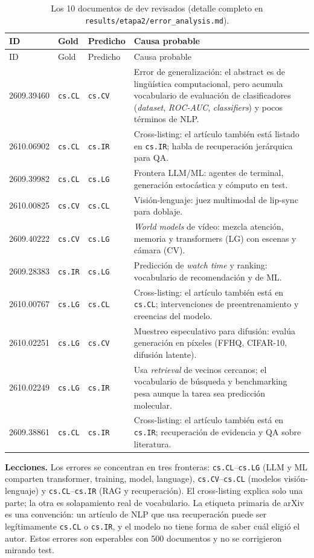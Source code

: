 \documentclass[11pt,a4paper]{article}
\newcommand{\code}[1]{\texttt{#1}}
\begin{document}
\begin{longtable}{@{}p{1.9cm}p{2.3cm}p{2.3cm}>{\raggedright\arraybackslash}p{7.2cm}@{}}
\caption{Los 10 documentos de dev revisados (detalle completo en
\code{results/etapa2/error\_analysis.md}).}\\
\toprule
ID & Gold & Predicho & Causa probable\\
\midrule
\endfirsthead
\toprule
ID & Gold & Predicho & Causa probable\\
\midrule
\endhead
2609.39460 & \code{cs.CL} & \code{cs.CV} & Error de generalización: el abstract es de lingüística computacional, pero acumula vocabulario de evaluación de clasificadores (\emph{dataset}, \emph{ROC-AUC}, \emph{classifiers}) y pocos términos de NLP.\\
2610.06902 & \code{cs.CL} & \code{cs.IR} & Cross-listing: el artículo también está listado en \code{cs.IR}; habla de recuperación jerárquica para QA.\\
2609.39982 & \code{cs.CL} & \code{cs.LG} & Frontera LLM/ML: agentes de terminal, generación estocástica y cómputo en test.\\
2610.00825 & \code{cs.CV} & \code{cs.CL} & Visión-lenguaje: juez multimodal de lip-sync para doblaje.\\
2609.40222 & \code{cs.CV} & \code{cs.LG} & \emph{World models} de vídeo: mezcla atención, memoria y transformers (LG) con escenas y cámara (CV).\\
2609.28383 & \code{cs.IR} & \code{cs.LG} & Predicción de \emph{watch time} y ranking: vocabulario de recomendación y de ML.\\
2610.00767 & \code{cs.LG} & \code{cs.CL} & Cross-listing: el artículo también está en \code{cs.CL}; intervenciones de preentrenamiento y creencias del modelo.\\
2610.02251 & \code{cs.LG} & \code{cs.CV} & Muestreo especulativo para difusión: evalúa generación en píxeles (FFHQ, CIFAR-10, difusión latente).\\
2610.02249 & \code{cs.LG} & \code{cs.IR} & Usa \emph{retrieval} de vecinos cercanos; el vocabulario de búsqueda y benchmarking pesa aunque la tarea sea predicción molecular.\\
2609.38861 & \code{cs.CL} & \code{cs.IR} & Cross-listing: el artículo también está en \code{cs.IR}; recuperación de evidencia y QA sobre literatura.\\
\bottomrule
\end{longtable}

\textbf{Lecciones.} Los errores se concentran en tres fronteras: \code{cs.CL}--\code{cs.LG}
(LLM y ML comparten transformer, training, model, language), \code{cs.CV}--\code{cs.CL}
(modelos visión-lenguaje) y \code{cs.CL}--\code{cs.IR} (RAG y recuperación). El
cross-listing explica solo una parte; la otra es solapamiento real de vocabulario. La
etiqueta primaria de arXiv es una convención: un artículo de NLP que usa recuperación
puede ser legítimamente \code{cs.CL} o \code{cs.IR}, y el modelo no tiene forma de saber
cuál eligió el autor. Estos errores son esperables con 500 documentos y no se corrigieron
mirando test.
\end{document}
